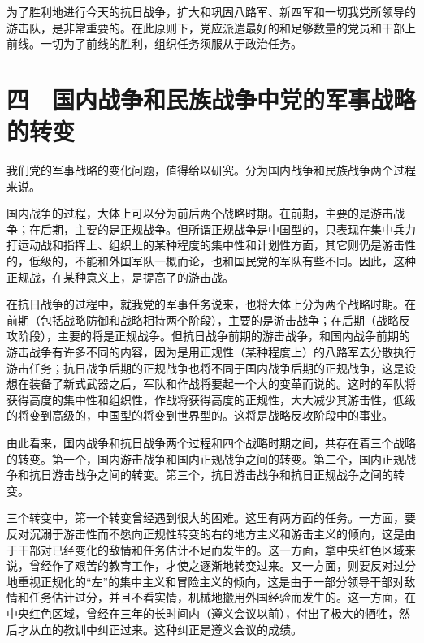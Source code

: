 为了胜利地进行今天的抗日战争，扩大和巩固八路军、新四军和一切我党所领导的游击队，是非常重要的。在此原则下，党应派遣最好的和足够数量的党员和干部上前线。一切为了前线的胜利，组织任务须服从于政治任务。

\section{四　国内战争和民族战争中党的军事战略的转变}

我们党的军事战略的变化问题，值得给以研究。分为国内战争和民族战争两个过程来说。

国内战争的过程，大体上可以分为前后两个战略时期。在前期，主要的是游击战争；在后期，主要的是正规战争。但所谓正规战争是中国型的，只表现在集中兵力打运动战和指挥上、组织上的某种程度的集中性和计划性方面，其它则仍是游击性的，低级的，不能和外国军队一概而论，也和国民党的军队有些不同。因此，这种正规战，在某种意义上，是提高了的游击战。

在抗日战争的过程中，就我党的军事任务说来，也将大体上分为两个战略时期。在前期（包括战略防御和战略相持两个阶段），主要的是游击战争；在后期（战略反攻阶段），主要的将是正规战争。但抗日战争前期的游击战争，和国内战争前期的游击战争有许多不同的内容，因为是用正规性（某种程度上）的八路军去分散执行游击任务；抗日战争后期的正规战争也将不同于国内战争后期的正规战争，这是设想在装备了新式武器之后，军队和作战将要起一个大的变革而说的。这时的军队将获得高度的集中性和组织性，作战将获得高度的正规性，大大减少其游击性，低级的将变到高级的，中国型的将变到世界型的。这将是战略反攻阶段中的事业。

由此看来，国内战争和抗日战争两个过程和四个战略时期之间，共存在着三个战略的转变。第一个，国内游击战争和国内正规战争之间的转变。第二个，国内正规战争和抗日游击战争之间的转变。第三个，抗日游击战争和抗日正规战争之间的转变。

三个转变中，第一个转变曾经遇到很大的困难。这里有两方面的任务。一方面，要反对沉溺于游击性而不愿向正规性转变的右的地方主义和游击主义的倾向，这是由于干部对已经变化的敌情和任务估计不足而发生的。这一方面，拿中央红色区域来说，曾经作了艰苦的教育工作，才使之逐渐地转变过来。又一方面，则要反对过分地重视正规化的“左”的集中主义和冒险主义的倾向，这是由于一部分领导干部对敌情和任务估计过分，并且不看实情，机械地搬用外国经验而发生的。这一方面，在中央红色区域，曾经在三年的长时间内（遵义会议以前），付出了极大的牺牲，然后才从血的教训中纠正过来。这种纠正是遵义会议的成绩。

